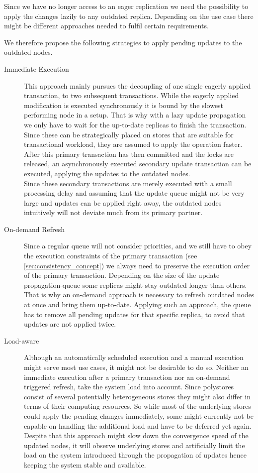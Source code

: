 Since we have no longer access to an eager replication we need the possibility to apply the changes lazily to any outdated replica.
Depending on the use case there might be different approaches needed to fulfil certain requirements.

We therefore propose the following strategies to apply pending updates to the outdated nodes.

\begin{description}
    \item[Immediate Execution] This approach mainly pursues the decoupling of one single eagerly applied transaction, to two subsequent transactions.
    While the eagerly applied modification is executed synchronously it is bound by the slowest performing node in a setup.
    That is why with a lazy update propagation we only have to wait for the up-to-date replicas to finish the transaction.
    Since these can be strategically placed on stores that are suitable for transactional workload, they are assumed to apply the operation faster.
    After this primary transaction has then committed and the locks are released, an asynchronously executed secondary update transaction can be executed, 
    applying the updates to the outdated nodes.\\
    Since these secondary transactions are merely executed with a small processing delay and assuming that the update queue might not be very large and 
    updates can be applied right away, the outdated nodes intuitively will not deviate much from its primary partner.

    \item[On-demand Refresh] Since a regular queue will not consider priorities, and we still have to obey the execution constraints of the primary transaction (see \ref{sec:consistency_concept})
    we always need to preserve the execution order of the primary transaction. Depending on the size of the update propagation-queue some replicas might stay outdated longer than others.
    That is why an on-demand approach is necessary to refresh outdated nodes at once and bring them up-to-date.
    Applying such an approach, the queue has to remove all pending updates for that specific replica, to avoid that updates are not applied twice. 
    
    \item[Load-aware] Although an automatically scheduled execution and a manual execution might serve most use cases, it might not be desirable to do so.
    Neither an immediate execution after a primary transaction nor an on-demand triggered refresh, take the system load into account.
    Since polystores consist of several potentially heterogeneous stores they might also differ in terms of their computing resources.
    So while most of the underlying stores could apply the pending changes immediately, some might currently not be capable on handling the additional load and have to 
    be deferred yet again. Despite that this approach might slow down the convergence speed of the updated nodes, 
    it will observe underlying stores and artificially limit the load on the system introduced through the propagation of updates hence keeping the system stable and available.


\end{description}
